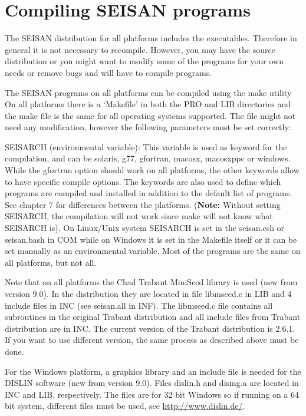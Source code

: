 %
\section{Compiling SEISAN programs}
\label{sect:compiling}

The SEISAN distribution for all platforms includes the executables. 
Therefore in general it is not necessary to recompile. However, 
you may have the source distribution or you might want to modify 
some of the programs for your own needs or remove bugs and will 
have to compile programs.

The SEISAN programs on all platforms can be compiled using the make 
utility On all platforms there is a `Makefile' in both the PRO and 
LIB directories and the make file is the same for all operating 
systems supported. The file might not need any modification, however 
the following parameters must be set correctly:

SEISARCH (environmental variable): This variable is used as keyword 
for the compilation, and can be solaris, g77, gfortran, macosx, 
macosxppc or windows. While the gfortran option should work on all 
platforms, the other keywords allow to have specific compile options. 
The keywords are also used to define which programs are compiled and 
installed in addition to the default list of programs. See chapter 7 
for differences between the platforms. (\textbf{Note:} Without setting SEISARCH, 
the compilation will not work since make will not know what SEISARCH is). 
On Linux/Unix system SEISARCH is set in the seisan.csh or seisan.bash in 
COM while on Windows it is set in the Makefile itself or it can be set 
manually as an environmental variable.  Most of the programs are the same 
on all platforms, but not all. 


Note that on all platforms the Chad Trabant MiniSeed library is used (new from 
version 9.0). In the distribution they are located in file 
libmseed.c in LIB and 4 include files in INC (see seisan.all in INF). The libmseed.c file contains all subroutines in the original Trabant distribution and all include files from Trabant distribution are in INC. The current version of the Trabant distribution is 2.6.1. If you want to use different version, the same process as described above must be done.
 

For the Windows platform, a graphics library and an include file is
needed for the DISLIN software (new from version 9.0). Files
dislin.h and dismg.a are located in INC and LIB, respectively. 
The files are for 32 bit Windows so if running on a 64 bit system, different
files must be used, see
\url{http://www.dislin.de/}.


